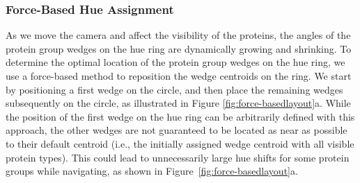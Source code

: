 \documentclass{egpubl}
\begin{document}
	\subsubsection{Force-Based Hue Assignment}
	
	
	As we move the camera and affect the visibility of the proteins, the angles of the protein group wedges on the hue ring are dynamically growing and shrinking. 
	To determine the optimal location of the protein group wedges on the hue ring, we use a force-based method to reposition the wedge centroids on the ring. 
	We start by positioning a first wedge on the circle, and then place the remaining wedges subsequently on the circle, as illustrated in Figure \ref{fig:force-basedlayout}a.
	While the position of the first wedge on the hue ring can be arbitrarily defined with this approach, the other wedges are not guaranteed to be located as near as possible to their default centroid (i.e., the initially assigned wedge centroid with all visible protein types).
	This could lead to unnecessarily large hue shifts for some protein groups while navigating, as shown in Figure~\ref{fig:force-basedlayout}a.
	
\end{document}
